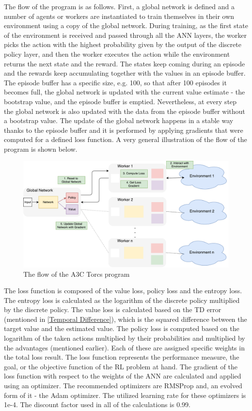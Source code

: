 The flow of the program is as follows. First, a global network is defined and a number of agents or workers are instantiated to train themselves in their own environment using a copy of the global network. During training, as the first state of the environment is received and passed through all the ANN layers, the worker picks the action with the highest probability given by the output of the discrete policy layer, and then the worker executes the action while the environment returns the next state and the reward. The states keep coming during an episode and the rewards keep accumulating together with the values in an episode buffer. The episode buffer has a specific size, e.g. 100, so that after 100 episodes it becomes full, the global network is updated with the current value estimate - the bootstrap value, and the episode buffer is emptied. Nevertheless, at every step the global network is also updated with the data from the episode buffer without a bootstrap value. The update of the global network happens in a stable way thanks to the episode buffer and it is performed by applying gradients that were computed for a defined loss function. A very general illustration of the flow of the program is shown below.
\begin{figure}[H]
	\centering
	\includegraphics[width=1.25\textwidth]{Figures/Flow}
	\caption{The flow of the A3C Torcs program}
	\label{Flow}
\end{figure}
The loss function is composed of the value loss, policy loss and the entropy loss. The entropy loss is calculated as the logarithm of the discrete policy multiplied by the discrete policy. The value loss is calculated based on the TD error (mentioned in \ref{Temporal Difference}), which is the squared difference between the target value and the estimated value. The policy loss is computed based on the logarithm of the taken actions multiplied by their probabilities and multiplied by the advantages (mentioned earlier). Each of these are assigned specific weights in the total loss result. The loss function represents the performance measure, the goal, or the objective function of the RL problem at hand. The gradient of the loss function with respect to the weights of the ANN are calculated and applied using an optimizer. The recommended optimizers are RMSProp and, an evolved form of it - the Adam optimizer. The utilized learning rate for these optimizers is 1e-4. The discount factor used in all of the calculations is 0.99.